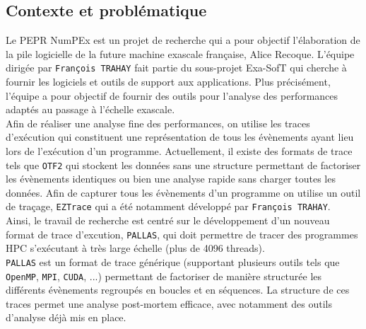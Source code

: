 

\subsection{Contexte et problématique}\label{ssec:introduction_contexte_problematique}

Le PEPR NumPEx est un projet de recherche qui a pour objectif l'élaboration de la pile logicielle de la future machine exascale française, Alice Recoque. L'équipe dirigée par \verb!François TRAHAY!
fait partie du sous-projet Exa-SofT qui cherche à fournir les logiciels et outils de support aux applications. Plus précisément, l'équipe a pour objectif de fournir des outils pour l'analyse des performances
adaptés au passage à l'échelle exascale. \\
Afin de réaliser une analyse fine des performances, on utilise les traces d'exécution qui constituent une représentation de tous les évènements ayant lieu lors de l'exécution d'un programme.
Actuellement, il existe des formats de trace tels que \verb!OTF2! qui stockent les données sans une structure permettant de factoriser les évènements identiques ou bien une analyse rapide sans charger toutes les données. 
Afin de capturer tous les évènements d'un programme on utilise un outil de traçage, \verb!EZTrace! qui a été notamment 
développé par \verb!François TRAHAY!.
\\Ainsi, le travail de recherche est centré sur le développement d'un nouveau format de trace d'excution, \verb!PALLAS!, qui doit permettre de tracer des programmes HPC s'exécutant à très large échelle
(plus de 4096 threads).\\
\verb!PALLAS! est un format de trace générique (supportant plusieurs outils tels que \verb!OpenMP!, \verb!MPI!, \verb!CUDA!, ...) permettant de factoriser de manière structurée les différents évènements 
regroupés en boucles et en séquences. La structure de ces traces permet une analyse post-mortem efficace, avec notamment des outils d'analyse déjà mis en place.

